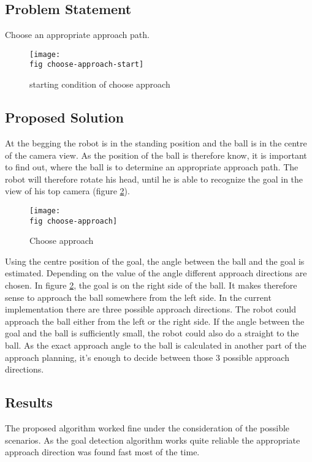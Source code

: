 \subsection*{Problem Statement}
Choose an appropriate approach path.


\begin{figure}[ht]
	\texttt{[image: \\fig choose-approach-start]}
	\caption{starting condition of choose approach}
	\label{j figure starting condition choose-approach}
\end{figure}

\subsection*{Proposed Solution}
At the begging the robot is in the standing position and the ball is in the centre of the camera view. As the position of the ball is therefore know, it is important to find out, where the ball is to determine an appropriate approach path. The robot will therefore rotate his head, until he is able to recognize the goal in the view of his top camera (figure \ref{j figure choose-approach}).

\begin{figure}[ht]
	\texttt{[image: \\fig choose-approach]}
	\caption{Choose approach}
	\label{j figure choose-approach}
\end{figure}

Using the centre position of the goal, the angle between the ball and the goal is estimated. Depending on the value of the angle different approach directions are chosen. In figure \ref{j figure choose-approach}, the goal is on the right side of the ball. It makes therefore sense to approach the ball somewhere from the left side. In the current implementation there are three possible approach directions. The robot could approach the ball either from the left or the right side. If the angle between the goal and the ball is sufficiently small, the robot could also do a straight to the ball. As the exact approach angle to the ball is calculated in another part of the approach planning, it's enough to decide between those 3 possible approach directions.

\subsection*{Results}
The proposed algorithm worked fine under the consideration of the possible scenarios. As the goal detection algorithm works quite reliable the appropriate approach direction was found fast most of the time.

